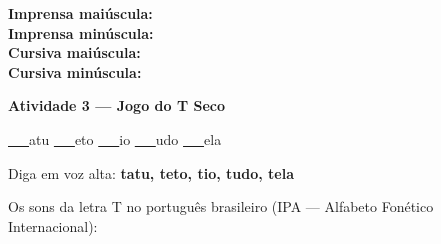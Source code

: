 \begin{consolidacao}
\begin{center}
\textbf{Imprensa mai\'uscula:} \underline{\hspace{1cm}} \underline{\hspace{1cm}} \underline{\hspace{1cm}} \underline{\hspace{1cm}} \underline{\hspace{1cm}}\\[0.5em]
\textbf{Imprensa min\'uscula:} \underline{\hspace{1cm}} \underline{\hspace{1cm}} \underline{\hspace{1cm}} \underline{\hspace{1cm}} \underline{\hspace{1cm}}\\[0.5em]
\textbf{Cursiva mai\'uscula:} \underline{\hspace{1cm}} \underline{\hspace{1cm}} \underline{\hspace{1cm}} \underline{\hspace{1cm}} \underline{\hspace{1cm}}\\[0.5em]
\textbf{Cursiva min\'uscula:} \underline{\hspace{1cm}} \underline{\hspace{1cm}} \underline{\hspace{1cm}} \underline{\hspace{1cm}} \underline{\hspace{1cm}}
\end{center}

\textbf{Atividade 3 --- Jogo do T Seco}


\begin{center}
\underline{~~~}atu \quad \underline{~~~}eto \quad \underline{~~~}io \quad \underline{~~~}udo \quad \underline{~~~}ela
\end{center}
Diga em voz alta: \textbf{tatu, teto, tio, tudo, tela}

\end{consolidacao}


\begin{sonsdaletra}
Os sons da letra T no portugu\^es{} brasileiro (IPA --- Alfabeto Fon\'etico Internacional):

\end{sonsdaletra}

